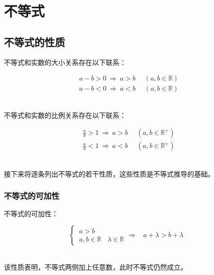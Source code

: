 \documentclass[UTF8]{ctexart}
\begin{document}
\newpage

\section{不等式}

\subsection{不等式的性质}
    不等式和实数的大小关系存在以下联系：\vspace{5pt}
    \begin{large}
        \begin{align*}
            &a-b>0~\Rightarrow~a>b~~~~~~(a,b\in\mathbb{R})\\[2mm]
            &a-b<0~\Rightarrow~a<b~~~~~~(a,b\in\mathbb{R})
        \end{align*}
    \end{large}\\
    不等式和实数的比例关系存在以下联系：\vspace{5pt}
    \begin{large}
        \begin{align*}
            &\frac{a}{b}>1~\Rightarrow~a>b~~~~~~(a,b\in\mathbb{R^+})\\[6mm]
            &\frac{a}{b}<1~\Rightarrow~a<b~~~~~~(a,b\in\mathbb{R^+})
        \end{align*}
    \end{large}\\
    接下来将逐条列出不等式的若干性质，这些性质是不等式推导的基础。\vspace{5pt}

\subsubsection{不等式的可加性}
    不等式的可加性：\vspace{5pt}
    \begin{large}
        \begin{equation*}
            \begin{cases}
                ~a>b\\[2mm]
                ~a,b\in\mathbb{R}~~~~\lambda\in\mathbb{R}
            \end{cases}
            \Rightarrow~~~~a+\lambda>b+\lambda
        \end{equation*}
    \end{large}\\[1mm]
    该性质表明，不等式两侧加上任意数，此时不等式仍然成立。
\end{document}
